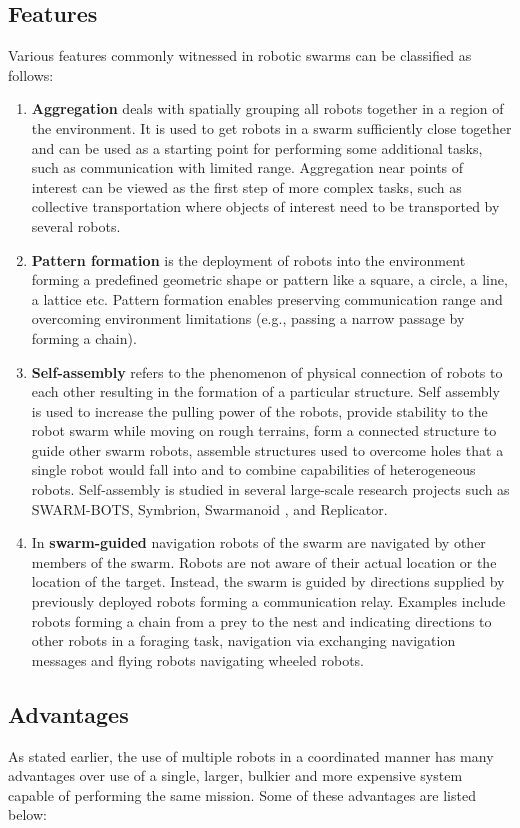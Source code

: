 \begin{spacing}{2}
\subsection*{Features}
Various features commonly witnessed in robotic swarms can be classified as follows:
\begin{enumerate}
    \item \textbf{Aggregation} deals with spatially grouping all robots together in a region of the environment. It is used to get robots in a swarm sufficiently close together and can be used as a starting point for performing some additional tasks, such as communication with limited range. Aggregation near points of interest can be viewed as the first step of more complex tasks, such as collective transportation where objects of interest need to be transported by several robots. 
    \item \textbf{Pattern formation} is the deployment of robots into the environment forming a predefined geometric shape or pattern like a square, a circle, a line, a lattice etc. Pattern formation enables preserving communication range and overcoming environment limitations (e.g., passing a narrow passage by forming a chain).
    \item \textbf{Self-assembly} refers to the phenomenon of physical connection of robots to each other resulting in the formation of a particular structure. Self assembly is used to increase the pulling power of the robots, provide stability to the robot swarm while moving on rough terrains, form a connected structure to guide other swarm robots, assemble structures used to overcome holes that a single robot would fall into and to combine capabilities of heterogeneous robots. Self-assembly is studied in several large-scale research projects such as SWARM-BOTS, Symbrion, Swarmanoid , and Replicator.
    \item In\textbf{ swarm-guided} navigation robots of the swarm are navigated by other members of the swarm. Robots are not aware of their actual location or the location of the target. Instead, the swarm is guided by directions supplied by previously deployed robots forming a communication relay. Examples include robots forming a chain from a prey to the nest and indicating directions to other robots in a foraging task, navigation via exchanging navigation messages and flying robots navigating wheeled robots. 
\end{enumerate}

\subsection*{Advantages}
As stated earlier, the use of multiple robots in a coordinated manner has many advantages over use of a single, larger, bulkier and more expensive system capable of performing the same mission. Some of these advantages are listed below:


\end{spacing}
